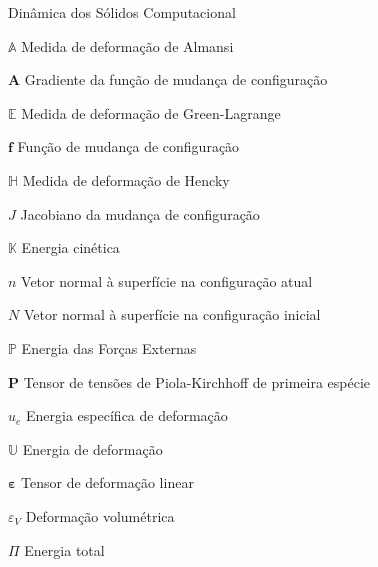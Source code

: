 \documentclass[12pt,
	openright,	%
	twoside,    %
	a4paper,			%
	sumario=tradicional,
	english,			%
	french, 			%
	brazil				%
]{USPSC}
\begin{document}
\begin{simbolos}
    \item[Dinâmica dos Sólidos Computacional]
    \item[$\mathbb{A}$] Medida de deformação de Almansi
    \item[$\mathbf{A}$] Gradiente da função de mudança de configuração
    \item[$\mathbb{E}$] Medida de deformação de Green-Lagrange
    \item[$\mathbf{f}$] Função de mudança de configuração
    \item[$\mathbb{H}$] Medida de deformação de Hencky
    \item[$J$] Jacobiano da mudança de configuração
    \item[$\mathbb{K}$] Energia cinética
    \item[$n$] Vetor normal à superfície na configuração atual
    \item[$N$] Vetor normal à superfície na configuração inicial
    \item[$\mathbb{P}$] Energia das Forças Externas
    \item[$\mathbf{P}$] Tensor de tensões de Piola-Kirchhoff de primeira espécie
    \item[$u_e$] Energia específica de deformação
    \item[$\mathbb{U}$] Energia de deformação
    \item[$\mathbf{\varepsilon}$] Tensor de deformação linear
    \item[$\varepsilon_V$] Deformação volumétrica
    \item[$\Pi$] Energia total
    

\end{simbolos}
\end{document}
